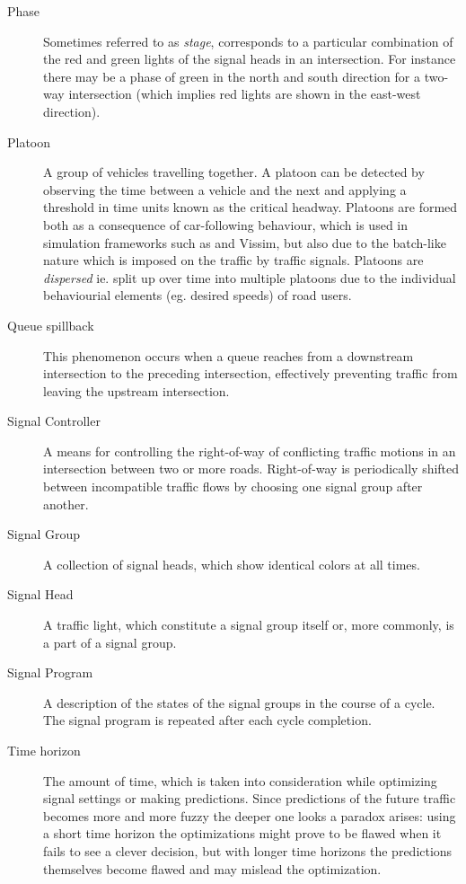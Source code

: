 \begin{description}
	\item[Phase] Sometimes referred to as \textit{stage}, corresponds to a particular combination of the red and green lights of the signal heads in an intersection.
	For instance there may be a phase of green in the north and south direction for a two-way intersection (which implies red lights are shown in the east-west direction).
	
	\item[Platoon] A group of vehicles travelling together. A platoon can be detected by observing the time between a vehicle and the next and applying a threshold in time units known as the critical headway.
Platoons are formed both as a consequence of car-following behaviour, which is used in simulation frameworks such as \cite{treiber-2000-62} and Vissim, but also due to the batch-like nature which is imposed on the traffic by traffic signals.
Platoons are \textit{dispersed} ie. split up over time into multiple platoons due to the individual behaviourial elements (eg. desired speeds) of road users.

\item[Queue spillback] This phenomenon occurs when a queue reaches from a downstream intersection to the preceding intersection, effectively preventing traffic from leaving the upstream intersection.

\item[Signal Controller] A means for controlling the right-of-way of conflicting traffic motions in an intersection between two or more roads. Right-of-way is periodically shifted between incompatible traffic flows by choosing one signal group after another.

\item[Signal Group] A collection of signal heads, which show identical colors at all times.

\item[Signal Head] A traffic light, which constitute a signal group itself or, more commonly, is a part of a signal group.

\item[Signal Program] A description of the states of the signal groups in the course of a cycle. The signal program is repeated after each cycle completion.

\item[Time horizon] The amount of time, which is taken into consideration while optimizing signal settings or making predictions. Since predictions of the future traffic becomes more and more fuzzy the deeper one looks a paradox arises: using a short time horizon the optimizations might prove to be flawed when it fails to see a clever decision, but with longer time horizons the predictions themselves become flawed and may mislead the optimization.


\end{description}
